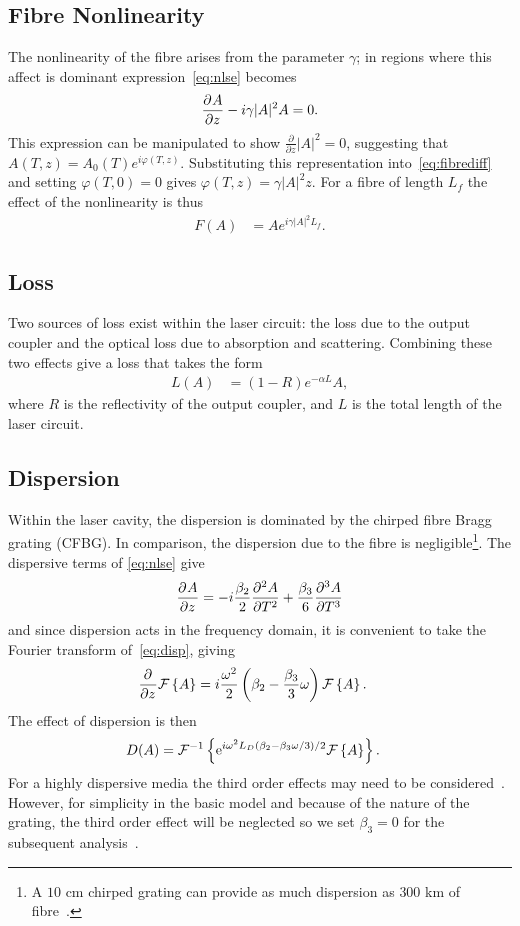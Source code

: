 \subsection{Fibre Nonlinearity}
The nonlinearity of the fibre arises from the parameter $\gamma$; in regions where this affect is dominant expression~\eqref{eq:nlse} becomes
\begin{align}
\label{eq:fibrediff}
	\pdiff{A}{z} - i \gamma |A|^2 A = 0.
\end{align}
This expression can be manipulated to show $\frac{\partial}{\partial z} |A|^2 = 0$, suggesting that $A(T,z) = A_0(T) e^{i \varphi(T,z)}$. Substituting this representation into~\eqref{eq:fibrediff} and setting $\varphi(T,0)=0$ gives $\varphi(T,z) = \gamma |A|^2 z$. For a fibre of length $L_f$ the effect of the nonlinearity is thus
\begin{align*}
F(A) &= A e^{i \gamma |A|^2 L_f}.
\end{align*}

\subsection{Loss}
Two sources of loss exist within the laser circuit: the loss due to the output coupler and the optical loss due to absorption and scattering. Combining these two effects give a loss that takes the form
\begin{align*}
L(A) &= (1 - R) e^{- \alpha L}A,
\end{align*}
where $R$ is the reflectivity of the output coupler, and $L$ is the total length of the laser circuit.

\subsection{Dispersion}
Within the laser cavity, the dispersion is dominated by the chirped fibre Bragg grating (CFBG). In comparison, the dispersion due to the fibre is negligible\footnote{A $10$ cm chirped grating can provide as much dispersion as $300$ km of fibre~\cite{agrawal2002}.}. The dispersive terms of \eqref{eq:nlse} give
\begin{align}
\label{eq:disp}
	\pdiff{A}{z} = -i \frac{\beta_2}{2} \pdiff[2]{A}{T} + \frac{\beta_3}{6} \pdiff[3]{A}{T}
\end{align}
and since dispersion acts in the frequency domain, it is convenient to take the Fourier transform of~\eqref{eq:disp}, giving
\begin{align*}
	\frac{\partial^{}}{\partial{z}^{}}\mathcal{F}\left\{ A \right\} &= i\frac{\omega^2}{2}\left(\beta_2 - \frac{\beta_3}{3} \omega\right) \mathcal{F}\left\{ A \right\}.
\end{align*}
The effect of dispersion is then
\begin{align*}
D(A) &= \mathcal{F}^{-1}\left\{ \textrm{e}^{i \omega^2 L_D(\beta_2 - \beta_3 \omega/3)/2} \mathcal{F}\left\{ A \right\} \right\}.
\end{align*}
For a highly dispersive media the third order effects may need to be considered~\cite{agrawal2013, litchinitser}. However, for simplicity in the basic model and because of the nature of the grating, the third order effect will be neglected so we set $\beta_3=0$ for the subsequent analysis~\cite{agrawal2013, ferreira}.

